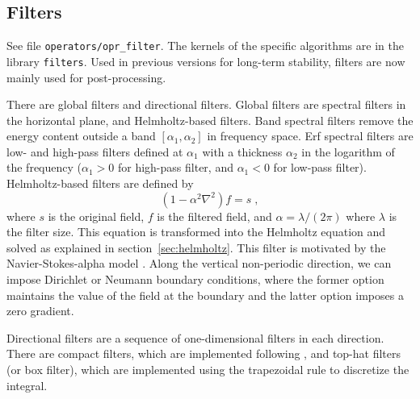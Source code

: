 \subsection{Filters}\label{sec:filters}

See file {\tt operators/opr\_filter}. The kernels of the specific algorithms are in the library {\tt filters}. Used in previous versions for long-term stability, filters are now mainly used for post-processing.

There are global filters and directional filters. Global filters are spectral filters in the horizontal plane, and Helmholtz-based filters. Band spectral filters remove the energy content outside a band $[\alpha_1,\alpha_2]$ in frequency space. Erf spectral filters are low- and high-pass filters defined at $\alpha_1$ with a thickness $\alpha_2$ in the logarithm of the frequency ($\alpha_1>0$ for high-pass filter, and $\alpha_1<0$ for low-pass filter). Helmholtz-based filters are defined by
\begin{equation}
  (1-\alpha^2\nabla^2) f = s \;,
\end{equation}
where $s$ is the original field, $f$ is the filtered field, and $\alpha=\lambda/(2\pi)$ where $\lambda$ is the filter size. This equation is transformed into the Helmholtz equation and solved as explained in section~\ref{sec:helmholtz}. This filter is motivated by the Navier-Stokes-alpha model \citep{Foias:2001}. Along the vertical non-periodic direction, we can impose Dirichlet or Neumann boundary conditions, where the former option maintains the value of the field at the boundary and the latter option imposes a zero gradient.

Directional filters are a sequence of one-dimensional filters in each direction. There are compact filters, which are implemented following \cite{Lele:1992}, and top-hat filters (or box filter), which are implemented using the trapezoidal rule to discretize the integral.

